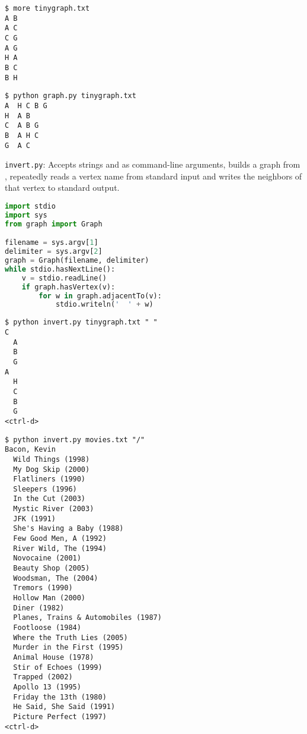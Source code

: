 \documentclass[8pt,a4paper,compress,handout]{beamer}
\begin{document}
\begin{frame}[fragile]
\begin{lstlisting}[language={}]
$ more tinygraph.txt
A B
A C
C G
A G
H A
B C
B H
\end{lstlisting}

\begin{lstlisting}[language={}]
$ python graph.py tinygraph.txt 
A  H C B G 
H  A B 
C  A B G 
B  A H C 
G  A C 

\end{lstlisting}
\end{frame}

\begin{frame}[fragile]
\begin{framed}
\tiny \lstinline{invert.py}: Accepts strings  and  as command-line arguments, builds a graph from , repeatedly reads a vertex name from standard input and writes the neighbors of that vertex to standard output.
\end{framed}

\begin{lstlisting}[language=Python]
import stdio
import sys
from graph import Graph

filename = sys.argv[1]
delimiter = sys.argv[2]
graph = Graph(filename, delimiter)
while stdio.hasNextLine():
    v = stdio.readLine()
    if graph.hasVertex(v):
        for w in graph.adjacentTo(v):
            stdio.writeln('  ' + w)
\end{lstlisting}

\begin{lstlisting}[language={}]
$ python invert.py tinygraph.txt " "
C
  A
  B
  G
A
  H
  C
  B
  G
<ctrl-d>
\end{lstlisting}
\end{frame}

\begin{frame}[fragile]
\begin{lstlisting}[language={}]
$ python invert.py movies.txt "/"
Bacon, Kevin
  Wild Things (1998)
  My Dog Skip (2000)
  Flatliners (1990)
  Sleepers (1996)
  In the Cut (2003)
  Mystic River (2003)
  JFK (1991)
  She's Having a Baby (1988)
  Few Good Men, A (1992)
  River Wild, The (1994)
  Novocaine (2001)
  Beauty Shop (2005)
  Woodsman, The (2004)
  Tremors (1990)
  Hollow Man (2000)
  Diner (1982)
  Planes, Trains & Automobiles (1987)
  Footloose (1984)
  Where the Truth Lies (2005)
  Murder in the First (1995)
  Animal House (1978)
  Stir of Echoes (1999)
  Trapped (2002)
  Apollo 13 (1995)
  Friday the 13th (1980)
  He Said, She Said (1991)
  Picture Perfect (1997)
<ctrl-d>
\end{lstlisting}
\end{frame}
\end{document}
